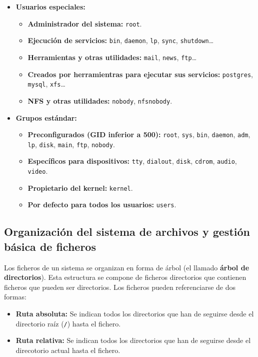 \begin{itemize}
	\item\textbf{Usuarios especiales:}
	\begin{itemize}
		\item\textbf{Administrador del sistema:} \texttt{root}.
		\item\textbf{Ejecución de servicios:} \texttt{bin}, \texttt{daemon}, \texttt{lp}, \texttt{sync}, \texttt{shutdown}\ldots
		\item\textbf{Herramientas y otras utilidades:} \texttt{mail}, \texttt{news}, \texttt{ftp}\ldots
		\item\textbf{Creados por herramientras para ejecutar sus servicios:} \texttt{postgres}, \texttt{mysql}, \texttt{xfs}\ldots
		\item\textbf{NFS y otras utilidades:} \texttt{nobody}, \texttt{nfsnobody}.
	\end{itemize}
	\item\textbf{Grupos estándar:}
	\begin{itemize}
		\item\textbf{Preconfigurados (GID inferior a 500):} \texttt{root}, \texttt{sys}, \texttt{bin}, \texttt{daemon}, \texttt{adm}, \texttt{lp}, \texttt{disk}, \texttt{main}, \texttt{ftp}, \texttt{nobody}.
		\item\textbf{Específicos para dispositivos:} \texttt{tty}, \texttt{dialout}, \texttt{disk}, \texttt{cdrom}, \texttt{audio}, \texttt{video}.
		\item\textbf{Propietario del kernel:} \texttt{kernel}.
		\item\textbf{Por defecto para todos los usuarios:} \texttt{users}.
	\end{itemize}
\end{itemize}

\subsection{Organización del sistema de archivos y gestión básica de ficheros}

Los ficheros de un sistema se organizan en forma de árbol (el llamado \textbf{árbol de directorios}).
Esta estructura se compone de ficheros directorios que contienen ficheros que pueden ser directorios.
Los ficheros pueden referenciarse de dos formas:

\begin{itemize}
	\item\textbf{Ruta absoluta:} Se indican todos los directorios que han de seguirse desde el directorio raíz (\texttt{/}) hasta el fichero.
	\item\textbf{Ruta relativa:} Se indican todos los directorios que han de seguirse desde el direcotorio actual hasta el fichero.
\end{itemize}

